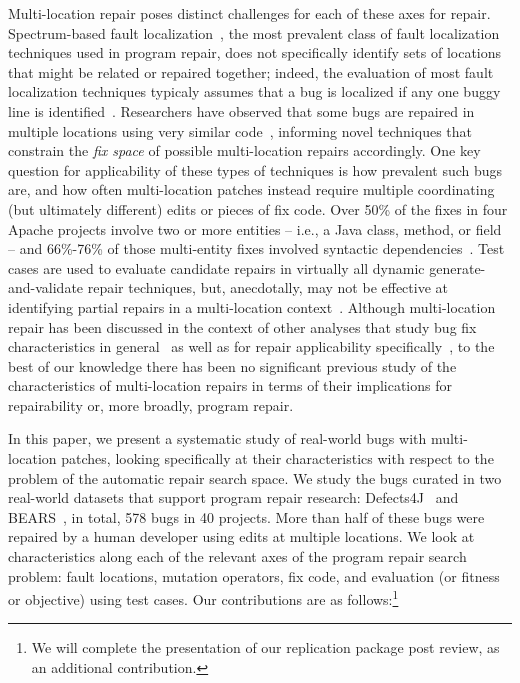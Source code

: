 \documentclass[sigconf, timestamp-false, anonymous=true]{acmart}
\begin{document}
Multi-location repair poses distinct challenges for each of these axes for repair.
Spectrum-based fault localization~\cite{ochiai}, the most prevalent class of
fault localization techniques used in program repair, does not specifically
identify sets of locations that might be related or repaired together; indeed,
the evaluation of most fault localization techniques typicaly assumes that a bug
is localized if any one buggy line is identified~\cite{fl-survey-wong}.
Researchers have observed that some bugs are
repaired in multiple locations using very similar
code~\cite{saha2019harnessing,jiang2019cmsuggester}, informing novel techniques
that constrain the \emph{fix space} of possible multi-location repairs accordingly.
One key question for applicability of these types of techniques is how prevalent
such bugs are, and how often multi-location patches instead require multiple
coordinating (but ultimately different) edits or pieces of fix code.  Over 50\% of the fixes in four 
Apache projects involve two or more entities -- i.e., a Java class, method, or field -- and 66\%-76\% of 
those multi-entity fixes involved syntactic dependencies~\cite{wang2018}. 
Test cases are used to evaluate candidate repairs in virtually all dynamic
generate-and-validate repair techniques, but, anecdotally, may not be effective
at identifying partial repairs in a multi-location
context~\cite{better-fitness}.  
Although multi-location repair has been discussed in the context of other analyses
that study bug fix characteristics in general~\cite{d4j-dissection} as well as for
repair applicability specifically~\cite{zhong2015, wang2018}, to the best of our
knowledge there has been no significant previous study of the characteristics of
multi-location repairs in terms of their implications for repairability or, more
broadly, program repair.  

In this paper, we present a systematic study of real-world bugs with
multi-location patches,
looking specifically at their characteristics with respect to the problem of the
automatic repair search space.  
We study the bugs curated in two
real-world datasets that support program repair research: Defects4J~\cite{defects4j}
and BEARS~\cite{bears}, in total, 578 bugs in 40 projects. 
More than half of these bugs were repaired by a
human developer using edits at multiple locations.  We look at characteristics along each of the
relevant axes of the program repair search problem: fault locations, mutation
operators, fix code, and evaluation (or fitness or objective) using test cases.  Our 
contributions are
as follows:\footnote{We will complete the presentation of our replication package post review, as an additional contribution.}
\end{document}
